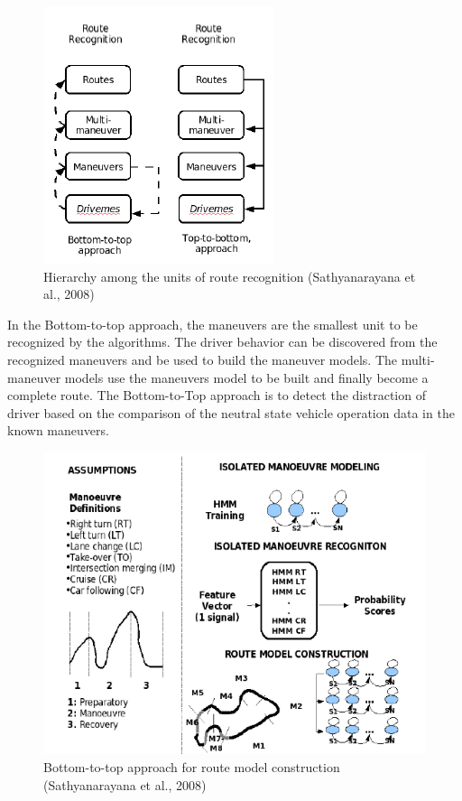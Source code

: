 \begin{figure}[hbt!]\centering
\includegraphics[width=.75\textwidth]{image/HMM_flowchart}
\caption{Hierarchy among the units of route recognition (Sathyanarayana et al., 2008)}
\end{figure}

In the Bottom-to-top approach, the maneuvers are the smallest unit to be recognized by the algorithms. The driver behavior can be discovered from the recognized maneuvers and be used to build the maneuver models. The multi-maneuver models use the maneuvers model to be built and finally become a complete route. The Bottom-to-Top approach is to detect the distraction of driver based on the comparison of the neutral state vehicle operation data in the known maneuvers.

\begin{figure}[hbt!]\centering
\includegraphics[width=.75\textwidth]{image/BottomtoTop}
\caption{Bottom-to-top approach for route model construction (Sathyanarayana et al., 2008)}
\end{figure}


